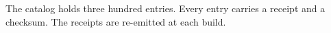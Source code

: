 The catalog holds three hundred entries.
Every entry carries a receipt and a checksum.
The receipts are re-emitted at each build.
